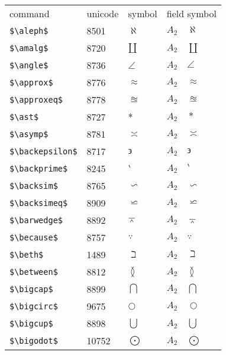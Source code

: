 \documentclass{article}
\begin{document}
\clearpage
\begin{table}
\begin{center}
\begin{tabular}{llll}
 command                    &unicode & symbol                & field symbol\\
 \verb#$\aleph$#              & 8501 & $\aleph$              & $A_2\quad \aleph$\\
 \verb#$\amalg$#              & 8720 & $\amalg$              & $A_2\quad \amalg$\\
 \verb#$\angle$#              & 8736 & $\angle$              & $A_2\quad \angle$\\
 \verb#$\approx$#             & 8776 & $\approx$             & $A_2\quad \approx$\\
 \verb#$\approxeq$#           & 8778 & $\approxeq$           & $A_2\quad \approxeq$\\
 \verb#$\ast$#                & 8727 & $\ast$                & $A_2\quad \ast$\\
 \verb#$\asymp$#              & 8781 & $\asymp$              & $A_2\quad \asymp$\\
 \verb#$\backepsilon$#        & 8717 & $\backepsilon$        & $A_2\quad \backepsilon$\\
 \verb#$\backprime$#          & 8245 & $\backprime$          & $A_2\quad \backprime$\\
 \verb#$\backsim$#            & 8765 & $\backsim$            & $A_2\quad \backsim$\\
 \verb#$\backsimeq$#          & 8909 & $\backsimeq$          & $A_2\quad \backsimeq$\\
 \verb#$\barwedge$#           & 8892 & $\barwedge$           & $A_2\quad \barwedge$\\
 \verb#$\because$#            & 8757 & $\because$            & $A_2\quad \because$\\
 \verb#$\beth$#               & 1489 & $\beth$               & $A_2\quad \beth$\\
 \verb#$\between$#            & 8812 & $\between$            & $A_2\quad \between$\\
 \verb#$\bigcap$#             & 8899 & $\bigcap$             & $A_2\quad \bigcap$\\
 \verb#$\bigcirc$#            & 9675 & $\bigcirc$            & $A_2\quad \bigcirc$\\
 \verb#$\bigcup$#             & 8898 & $\bigcup$             & $A_2\quad \bigcup$\\
 \verb#$\bigodot$#           & 10752 & $\bigodot$            & $A_2\quad \bigodot$\\

\end{tabular}
\end{center}
\end{table}
\end{document}
